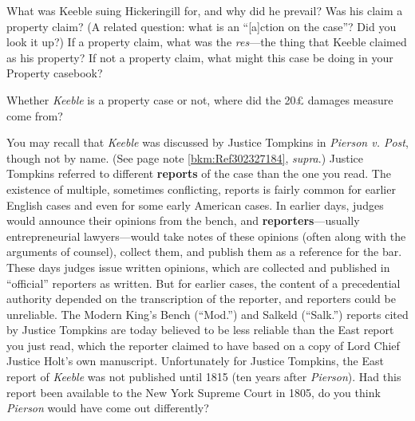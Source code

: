 
\item What was Keeble suing Hickeringill for, and why did he prevail? Was his
claim a property claim? (A related question: what is an ``[a]ction on the
case''? Did you look it up?) If a property claim, what was the
\textit{res}---the thing that Keeble claimed as his property? If not a property
claim, what might this case be doing in your Property casebook? 
\item Whether \textit{Keeble} is a property case or not, where did the
20{\pounds} damages measure come from?
\item You may recall that \textit{Keeble} was discussed by Justice Tompkins in
\textit{Pierson v. Post}, though not by name. (See page
\pageref{bkm:Ref302327184} note \ref{bkm:Ref302327184}, \textit{supra}.) Justice
Tompkins referred to different \textbf{reports} of the case than the one you
read. The existence of
multiple, sometimes conflicting, reports is fairly common for earlier English
cases and even for some early American cases. In earlier days, judges would
announce their opinions from the bench, and \textbf{reporters}---usually
entrepreneurial lawyers---would take notes of these opinions (often along with
the arguments of counsel), collect them, and publish them as a reference for the
bar. These days judges issue written opinions, which are collected and published
in ``official'' reporters as written. But for earlier cases, the content of a
precedential authority depended on the transcription of the reporter, and
reporters could be unreliable. The Modern King's Bench (``Mod.'') and Salkeld
(``Salk.'') reports cited by Justice Tompkins are today believed to be less
reliable than the East report you just read, which the reporter claimed to have
based on a copy of Lord Chief Justice Holt's own manuscript. Unfortunately for
Justice Tompkins, the East report of \textit{Keeble} was not published until
1815 (ten years after \textit{Pierson}). Had this report been available to the
New York Supreme Court in 1805, do you think \textit{Pierson} would have come
out differently?

